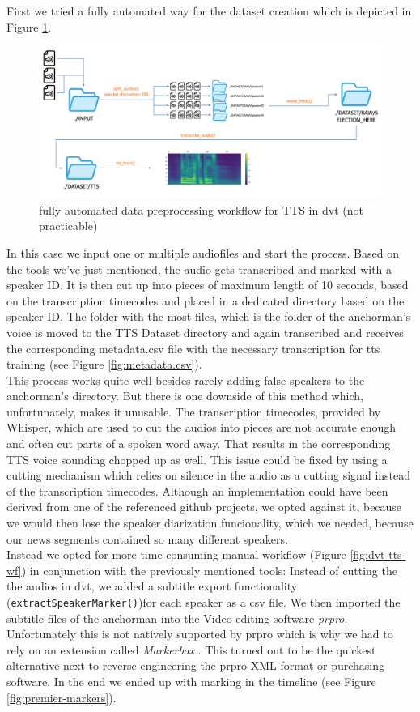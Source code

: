 \documentclass[
  a4paper,  %
  twoside,  %
  bibliography=totoc,
  headsepline,
  cleardoublepage=empty,
  parskip=half,
  draft=false
]{scrbook}
\begin{document}
First we tried a fully automated way for the dataset creation which is depicted in Figure \ref{fig:dvt-tts-original}.
\begin{figure}[h]
  \centering
  \includegraphics[width=1\textwidth]{./graphics/images/tts/tts dvt only.png}
  \caption{fully automated data preprocessing workflow for TTS in \gls{dvt} (not practicable)}
  \label{fig:dvt-tts-original}
\end{figure}
In this case we input one or multiple audiofiles and start the process. Based on the tools we've just mentioned, the audio gets transcribed and marked with a speaker ID.
It is then cut up into pieces of maximum length of 10 seconds, based on the transcription timecodes and placed in a dedicated directory based on the speaker ID. The folder with the most files, which is the folder of the anchorman's voice is moved to the TTS Dataset directory and again transcribed and receives the corresponding metadata.csv file with the necessary transcription for tts training (see Figure \ref{fig:metadata.csv}). \\
This process works quite well besides rarely adding false speakers to the anchorman's directory. But there is one downside of this method which, unfortunately, makes it unusable. The transcription timecodes, provided by Whisper, which are used to cut the audios into pieces are not accurate enough and often cut parts of a spoken word away. That results in the corresponding TTS voice sounding chopped up as well. This issue could be fixed by using a cutting mechanism which relies on silence in the audio as a cutting signal instead of the transcription timecodes. Although an implementation could have been derived from one of the referenced github projects, we opted against it, because we would then lose the speaker diarization funcionality, which we needed, because our news segments contained so many different speakers. \\
Instead we opted for more time consuming manual workflow (Figure \ref{fig:dvt-tts-wf}) in conjunction with the previously mentioned tools: Instead of cutting the the audios in \gls{dvt}, we added a subtitle export functionality (\verb|extractSpeakerMarker()|)for each speaker as a csv file. We then imported the subtitle files of the anchorman into the Video editing software \textit{\gls{prpro}}. Unfortunately this is not natively supported by \gls{prpro} which is why we had to rely on an extension called \textit{Markerbox} \cite{montgomeryMARKERBOXFreeMarker}. This turned out to be the quickest alternative next to reverse engineering the \gls{prpro} XML format or purchasing software. In the end we ended up with marking in the timeline (see Figure \ref{fig:premier-markers}). 
\end{document}
